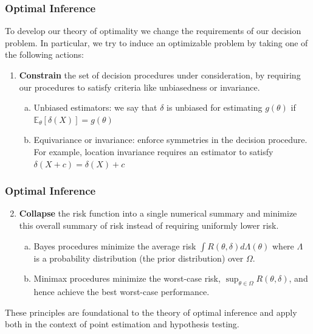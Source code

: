 \documentclass[10pt]{beamer}
\begin{document}
\begin{frame}
\frametitle{Optimal Inference}
To develop our theory of optimality we change the requirements of our decision problem. 
\newline
\newline
In particular, we try to induce an optimizable problem by taking one of the following actions:
\newline

\begin{enumerate}
\item{
\textbf{Constrain} the set of decision procedures under consideration, by requiring our procedures to satisfy criteria like unbiasedness or invariance.
\newline
\begin{enumerate}[(a)]
\item{Unbiased estimators: we say that $\delta$ is unbiased for estimating $g(\theta)$ if $\mathbb{E}_{\theta}[\delta(X)] = g(\theta)$}
\newline
\item{Equivariance or invariance: enforce symmetries in the decision procedure. For example, location invariance requires an estimator to satisfy $\delta(X + c) = \delta(X) + c$}
\end{enumerate}
}	
\end{enumerate}	
\end{frame}

\begin{frame}
\frametitle{Optimal Inference}
\begin{enumerate}
	
\setcounter{enumi}{1}

\item{
\textbf{Collapse} the risk function into a single numerical summary and minimize this overall summary of risk instead of requiring uniformly lower risk.
\newline
\begin{enumerate}[(a)]
\item{Bayes procedures minimize the average risk $\int R(\theta, \delta)d\Lambda(\theta)$ where $\Lambda$ is a probability distribution (the prior distribution) over $\Omega$.}
\newline
\item{Minimax procedures minimize the worst-case risk, $\sup_{\theta \in \Omega} R(\theta, \delta)$, and hence achieve the best worst-case performance.}
\end{enumerate}
}	
\end{enumerate}
\vspace{10pt}
These principles are foundational to the theory of optimal inference and apply both in the context of point estimation and hypothesis testing.
\end{frame}
\end{document}
